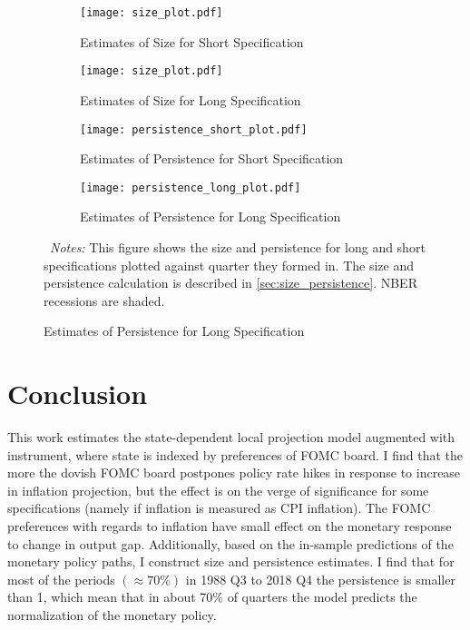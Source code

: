 \documentclass[11pt]{article}
\begin{document}
\begin{figure}[!hptb]\centering
  \caption{Size and Persistence Dynamics}
  \label{fig:size_persistence_plot}
  \vspace{1ex}
  \begin{minipage}{0.92\textwidth}
    \begin{subfigure}[b]{0.494\textwidth}\centering
      \caption{Estimates of Size for Short Specification}
    \texttt{[image: size\_plot.pdf]}
    \end{subfigure}\hfill   \begin{subfigure}[b]{0.494\textwidth}\centering
      \caption{Estimates of Size for Long Specification}
    \texttt{[image: size\_plot.pdf]}
    \end{subfigure}
    \vspace{1ex}
    \begin{subfigure}[b]{0.494\textwidth}\centering
      \caption{Estimates of Persistence for Short Specification}
    \texttt{[image: persistence\_short\_plot.pdf]}
    \end{subfigure}\hfill
    \begin{subfigure}[b]{0.494\textwidth}\centering      \caption{Estimates of Persistence for Long Specification}
    \texttt{[image: persistence\_long\_plot.pdf]}
    \end{subfigure}
    \begin{flushleft}\scriptsize
    ~\textit{Notes:} This figure shows the size and persistence for long and short specifications plotted against quarter they formed in. The size and persistence calculation is described in \vref{sec:size_persistence}. 
    NBER recessions are shaded.
    \end{flushleft}
  \end{minipage}  
\end{figure}

\section{Conclusion}

This work estimates the state-dependent local projection model augmented with instrument, where state is indexed by preferences of FOMC board. 
I find that the more the dovish FOMC board postpones policy rate hikes in response to increase in inflation projection, but the effect is on the verge of significance for some specifications (namely if inflation is measured as CPI inflation).
The FOMC preferences with regards to inflation have small effect on the monetary response to change in output gap.
Additionally, based on the in-sample predictions of the monetary policy paths, I construct size and persistence estimates. 
I find that for most of the periods $(\approx 70\%)$ in 1988 Q3 to 2018 Q4 the persistence is smaller than 1, which mean that in about 70\% of quarters the model predicts the normalization of the monetary policy.
\end{document}
